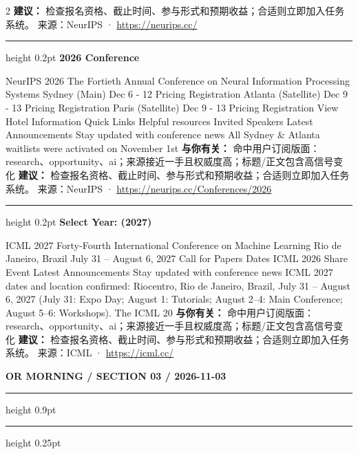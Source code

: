 \documentclass[10.5pt]{ctexart}
\begin{document}
\begin{multicols}{2}
\textbf{建议：} 检查报名资格、截止时间、参与形式和预期收益；合适则立即加入任务系统。
{\footnotesize\color{ormuted} 来源：NeurIPS · \url{https://neurips.cc/}}
\vspace{2mm}
\hrule height 0.2pt
\vspace{2mm}
{\large\bfseries 2026 Conference}\par
NeurIPS 2026 The Fortieth Annual Conference on Neural Information Processing Systems Sydney (Main) Dec 6 - 12 Pricing Registration Atlanta (Satellite) Dec 9 - 13 Pricing Registration Paris (Satellite) Dec 9 - 13 Pricing Registration View Hotel Information Quick Links Helpful resources Invited Speakers Latest Announcements Stay updated with conference news All Sydney \& Atlanta waitlists were activated on November 1st 
\textbf{与你有关：} 命中用户订阅版面：research、opportunity、ai；来源接近一手且权威度高；标题/正文包含高信号变化
\textbf{建议：} 检查报名资格、截止时间、参与形式和预期收益；合适则立即加入任务系统。
{\footnotesize\color{ormuted} 来源：NeurIPS · \url{https://neurips.cc/Conferences/2026}}
\vspace{2mm}
\hrule height 0.2pt
\vspace{2mm}
{\large\bfseries Select Year: (2027)}\par
ICML 2027 Forty-Fourth International Conference on Machine Learning Rio de Janeiro, Brazil July 31 – August 6, 2027 Call for Papers Dates ICML 2026 Share Event Latest Announcements Stay updated with conference news ICML 2027 dates and location confirmed: Riocentro, Rio de Janeiro, Brazil, July 31 – August 6, 2027 (July 31: Expo Day; August 1: Tutorials; August 2–4: Main Conference; August 5–6: Workshops). The ICML 20
\textbf{与你有关：} 命中用户订阅版面：research、opportunity、ai；来源接近一手且权威度高；标题/正文包含高信号变化
\textbf{建议：} 检查报名资格、截止时间、参与形式和预期收益；合适则立即加入任务系统。
{\footnotesize\color{ormuted} 来源：ICML · \url{https://icml.cc/}}
\end{multicols}
\newpage
{\small\bfseries OR MORNING / SECTION 03 / 2026-11-03}
\vspace{2mm}
\hrule height 0.9pt
\vspace{1.5mm}
\hrule height 0.25pt
\vspace{4mm}
\end{document}
